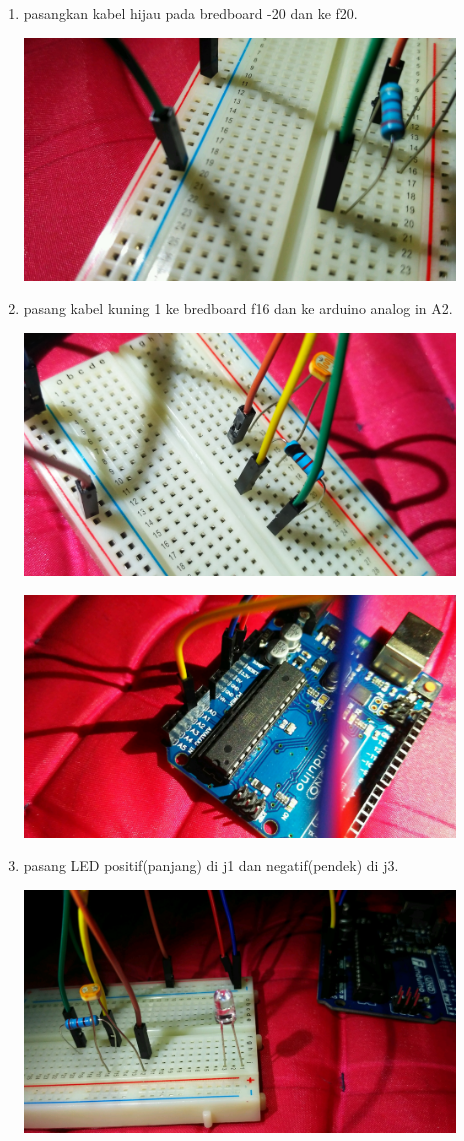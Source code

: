 \begin{enumerate}
	\item pasangkan kabel hijau pada bredboard -20 dan ke f20.
	\break
	\centerline{\includegraphics[width=0.9\textwidth]{figures/9.jpg}}
	\break
	\item pasang kabel kuning 1 ke bredboard f16 dan ke arduino analog in A2.
	\break
	\centerline{\includegraphics[width=0.9\textwidth]{figures/10.jpg}}
	\break
	\centerline{\includegraphics[width=0.9\textwidth]{figures/11.jpg}}
	\break
	\item pasang LED positif(panjang) di j1 dan negatif(pendek) di j3.
	\break
	\centerline{\includegraphics[width=0.9\textwidth]{figures/12.jpg}}

\end{enumerate}
